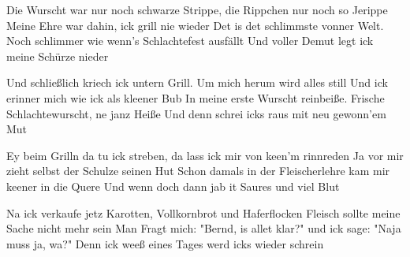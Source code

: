 \begin{guitar}
	Die Wurscht war nur noch schwarze Strippe, die Rippchen nur noch so Jerippe
	Meine Ehre war dahin, ick grill nie wieder
	Det is det schlimmste vonner Welt. Noch schlimmer wie wenn's Schlachtefest ausfällt
	Und voller Demut legt ick meine Schürze nieder
	
	Und schließlich kriech ick untern Grill. Um mich herum wird alles still
	Und ick erinner mich wie ick als kleener Bub
	In meine erste Wurscht reinbeiße. Frische Schlachtewurscht, ne janz Heiße
	Und denn schrei icks raus mit neu gewonn'em Mut
	
	\begin{highlightbar}
		 
	\end{highlightbar}
	
	\songsection{Strophe 7}
	Ey beim Grilln da tu ick streben, da lass ick mir von keen'm rinnreden
	Ja vor mir zieht selbst der Schulze seinen Hut
	Schon damals in der Fleischerlehre kam mir keener in die Quere
	Und wenn doch dann jab it Saures und viel Blut
	
	Na ick verkaufe jetz Karotten, Vollkornbrot und Haferflocken
	Fleisch sollte meine Sache nicht mehr sein
	Man Fragt mich: "Bernd, is allet klar?" und ick sage: "Naja muss ja, wa?"
	Denn ick weeß eines Tages werd icks wieder schrein
	
	\begin{highlightbar}
		  \optionalChord{(x2)}
	\end{highlightbar}\vspace{-1.3em}
\end{guitar}